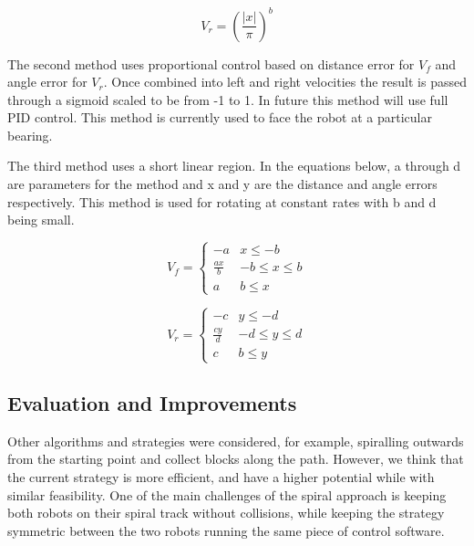 \begin{equation}
    V_r = (\frac{|x|}{\pi})^b
\end{equation}

The second method uses proportional control based on distance error for $V_f$ and angle error for $V_r$. Once combined into left and right velocities the result is passed through a sigmoid scaled to be from -1 to 1. In future this method will use full PID control. This method is currently used to face the robot at a particular bearing.

The third method uses a short linear region. In the equations below, a through d are parameters for the method and x and y are the distance and angle errors respectively. This method is used for rotating at constant rates with b and d being small.

\begin{equation}
    V_f =
    \begin{cases}
      -a & x\leq -b \\
      \frac{ax}{b} & -b \leq x\leq b \\
      a & b \leq x
   \end{cases}
\end{equation}

\begin{equation}
    V_r =
    \begin{cases}
      -c & y \leq -d \\
      \frac{cy}{d} & -d \leq y \leq d \\
      c & b \leq y
   \end{cases}
\end{equation}


%     



\subsection{Evaluation and Improvements}


Other algorithms and strategies were considered, for example, spiralling outwards from the starting point and collect blocks along the path. However, we think that the current strategy is more efficient, and have a higher potential while with similar feasibility. One of the main challenges of the spiral approach is keeping both robots on their spiral track without collisions, while keeping the strategy symmetric between the two robots running the same piece of control software.


